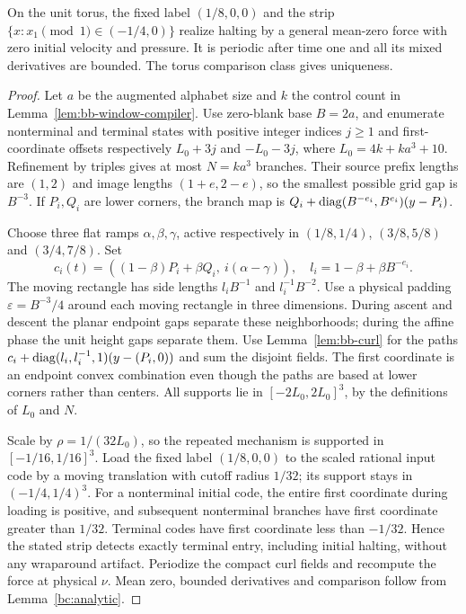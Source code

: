 \begin{theorem}\label{bc:guarded-torus}
On the unit torus, the fixed label $(1/8,0,0)$ and the strip
$\{x:x_1\pmod1\in(-1/4,0)\}$ realize halting by a general mean-zero
force with zero initial velocity and pressure. It is periodic after time
one and all its mixed derivatives are bounded. The torus comparison
class gives uniqueness.
\end{theorem}
\begin{proof}\label{bc:guarded-torus-proof}
Let $a$ be the augmented alphabet size and $k$ the control count in
Lemma~\ref{lem:bb-window-compiler}. Use zero-blank base $B=2a$, and enumerate
nonterminal and terminal states with positive integer indices $j\ge1$
and first-coordinate offsets respectively
$L_0+3j$ and $-L_0-3j$, where $L_0=4k+ka^3+10$.
Refinement by triples gives at most $N=ka^3$ branches. Their source
prefix lengths are $(1,2)$ and image lengths $(1+e,2-e)$, so the
smallest possible grid gap is $B^{-3}$. If $P_i,Q_i$ are lower corners,
the branch map is
$Q_i+\operatorname{diag}(B^{-e_i},B^{e_i})(y-P_i)$.

Choose three flat ramps $\alpha,\beta,\gamma$, active respectively in
$(1/8,1/4)$, $(3/8,5/8)$ and $(3/4,7/8)$. Set
\[
 c_i(t)=((1-\beta)P_i+\beta Q_i,\ i(\alpha-\gamma)),
 \quad l_i=1-\beta+\beta B^{-e_i}.
\]
The moving rectangle has side lengths $l_i B^{-1}$ and
$l_i^{-1}B^{-2}$. Use a physical padding
$\varepsilon=B^{-3}/4$ around each moving rectangle in three dimensions.
During ascent and descent the planar endpoint gaps separate these
neighborhoods; during the affine phase the unit height gaps separate them.
Use Lemma~\ref{lem:bb-curl} for the paths
$c_i+\operatorname{diag}(l_i,l_i^{-1},1)(y-(P_i,0))$ and sum the disjoint fields.
The first coordinate is an endpoint convex combination even though the
paths are based at lower corners rather than centers. All supports lie
in $[-2L_0,2L_0]^3$, by the definitions of $L_0$ and $N$.

Scale by $\rho=1/(32L_0)$, so the repeated mechanism is supported in
$[-1/16,1/16]^3$. Load the fixed label $(1/8,0,0)$ to the scaled
rational input code by a moving translation with cutoff radius $1/32$;
its support stays in $(-1/4,1/4)^3$. For a nonterminal initial code,
the entire first coordinate during loading is positive, and subsequent
nonterminal branches have first coordinate greater than $1/32$.
Terminal codes have first coordinate less than $-1/32$. Hence the stated
strip detects exactly terminal entry, including initial halting, without
any wraparound artifact. Periodize the compact curl fields and recompute
the force at physical $\nu$. Mean zero, bounded derivatives and comparison
follow from Lemma~\ref{bc:analytic}.
\end{proof}

